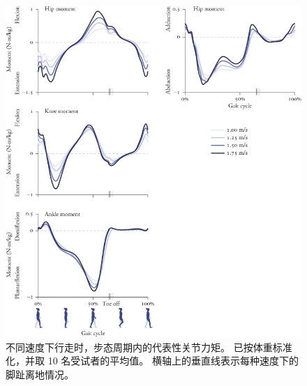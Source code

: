 \begin{figure}[!htb]
	\centering
	\includegraphics[width=1.0\linewidth]{chap8/8_9}
	\caption{不同速度下行走时，步态周期内的代表性关节力矩。
		已按体重标准化，并取 10 名受试者的平均值。
		横轴上的垂直线表示每种速度下的脚趾离地情况\cite{arnold2013muscle}。 \label{fig:8_9}}
\end{figure}


